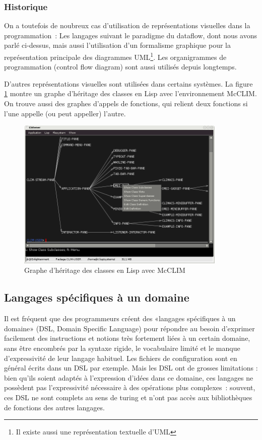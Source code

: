 \documentclass{article}
\begin{document}
\subsubsection{Historique}
On a toutefois de noubreux cas d'utilisation de représentations visuelles dans la programmation~: Les langages suivant le paradigme du
dataflow, dont nous avons parlé ci-dessus, mais aussi l'utilisation d'un formalisme graphique pour la représentation principale des
diagrammes UML\footnote{Il existe aussi une représentation textuelle d'UML\cite{htun-spec}}. Les organigrammes de programmation (control
flow diagram) sont aussi utilisés depuis longtemps.

D'autres représentations visuelles sont utilisées dans certains systèmes. La figure \ref{fig:lisp-class-graph} montre un graphe d'héritage
des classes en Lisp avec l'environnement McCLIM. On trouve aussi des graphes d'appels de fonctions, qui relient deux fonctions si l'une
appelle (ou peut appeller) l'autre.

\begin{figure}[h!]
  \centering
  \includegraphics[width=10cm]{lisp-class-graph}
  \caption{Graphe d'héritage des classes en Lisp avec McCLIM}
\label{fig:lisp-class-graph}
\end{figure}

\subsection{Langages spécifiques à un domaine}
\label{sec:dsl}

Il est fréquent que des programmeurs créent des «langages spécifiques à un domaine» (DSL, Domain Specific Language) pour répondre au besoin
d'exprimer facilement des instructions et notions très fortement liées à un certain domaine, sans être encombrés par la syntaxe rigide, le
vocabulaire limité et le manque d'expressivité de leur langage habituel. Les fichiers de configuration sont en général écrits dans un DSL
par exemple. Mais les DSL ont de grosses limitations : bien qu'ils soient adaptés à l'expression d'idées dans ce domaine, ces langages ne
possèdent pas l'expressivité nécessaire à des opérations plus complexes~: souvent, ces DSL ne sont complets au sens de turing et n'ont pas
accès aux bibliothèques de fonctions des autres langages.
\end{document}
